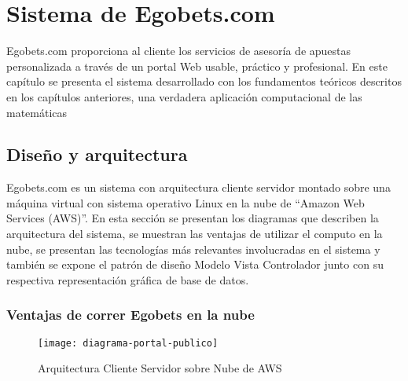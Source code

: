 \chapter{Sistema de Egobets.com}
\label{chap:software}
\graphicspath{{/Users/brunomedina/Dropbox/Tesis-Egobets/egobets-notas/resources/diagramas/}}

Egobets.com proporciona al cliente los servicios de asesoría de apuestas personalizada a través de un portal Web usable, práctico y profesional. En este capítulo se presenta el sistema desarrollado con los fundamentos teóricos descritos en los capítulos anteriores, una verdadera aplicación computacional de las matemáticas





\section{Diseño y arquitectura}
\label{sec:design}
Egobets.com es un sistema con arquitectura cliente servidor montado sobre una máquina virtual con sistema operativo Linux en la nube de ``Amazon Web Services (AWS)''. En esta sección se presentan los diagramas que describen la arquitectura del sistema, se muestran las ventajas de utilizar el computo en la nube, se presentan las tecnologías más relevantes involucradas en el sistema y también se expone el patrón de diseño Modelo Vista Controlador junto con su respectiva representación gráfica de base de datos.
\subsection{Ventajas de correr Egobets en la nube}
\begin{figure}[!htb]\centering
   \begin {minipage}{1\textwidth}
     \texttt{[image: diagrama-portal-publico]}
     \caption{Arquitectura Cliente Servidor sobre Nube de AWS}\label{Fig:diagrama-portal-publico}
   \end{minipage}
\end{figure}

